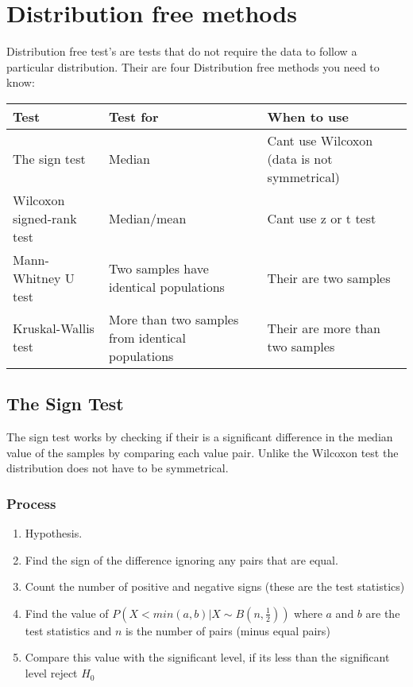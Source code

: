 \section{Distribution free methods}
    Distribution free test's are tests that do not require the data to follow a particular distribution. Their are four Distribution free methods you need to know:

    \begin{center}
    \begin{tabulary}{\linewidth}{|L|L|L|}
    \hline
    Test & Test for & When to use \\\hline
    The sign test & Median & Cant use Wilcoxon (data is not symmetrical) \\\hline
    Wilcoxon signed-rank test & Median/mean & Cant use z or t test \\\hline
    Mann-Whitney U test & Two samples have identical populations & Their are two samples \\\hline
    Kruskal-Wallis test & More than two samples from identical populations & Their are more than two samples \\\hline
    \end{tabulary}
    \end{center}

    \subsection{The Sign Test}
        
        The sign test works by checking if their is a significant difference in the median value of the samples by comparing each value pair. Unlike the Wilcoxon test the distribution does not have to be symmetrical.
        
        \subsubsection{Process}
            \begin{enumerate}
            \item Hypothesis.
            \item Find the sign of the difference ignoring any pairs that are equal.
            \item Count the number of positive and negative signs (these are the test statistics)
            \item Find the value of $P(X < min(a, b) | X \sim B(n, \frac{1}{2}))$ where $a$ and $b$ are the test statistics and $n$ is the number of pairs (minus equal pairs)
            \item Compare this value with the significant level, if its less than the significant level reject $H_0$
            \end{enumerate}
        
